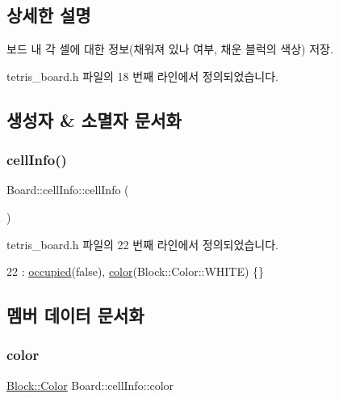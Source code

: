 \subsection{상세한 설명}
보드 내 각 셀에 대한 정보(채워져 있나 여부, 채운 블럭의 색상) 저장. 

tetris\+\_\+board.\+h 파일의 18 번째 라인에서 정의되었습니다.



\subsection{생성자 \& 소멸자 문서화}
\mbox{\label{struct_board_1_1cell_info_a6912555905168decac5c8dd1fba998a9}} 
\subsubsection{\texorpdfstring{cell\+Info()}{cellInfo()}}
{\footnotesize\ttfamily Board\+::cell\+Info\+::cell\+Info (\begin{DoxyParamCaption}{ }\end{DoxyParamCaption})\hspace{0.3cm}{\ttfamily [inline]}}



tetris\+\_\+board.\+h 파일의 22 번째 라인에서 정의되었습니다.


\begin{DoxyCode}
22 : \mbox{\hyperlink{struct_board_1_1cell_info_a518ee0af8b662d092a1e4dffefadf27c}{occupied}}(\textcolor{keyword}{false}), \mbox{\hyperlink{struct_board_1_1cell_info_ac4e0ca21aefe0f000144641e5eb6698d}{color}}(Block::Color::WHITE) \{\}
\end{DoxyCode}


\subsection{멤버 데이터 문서화}
\mbox{\label{struct_board_1_1cell_info_ac4e0ca21aefe0f000144641e5eb6698d}} 
\subsubsection{\texorpdfstring{color}{color}}
{\footnotesize\ttfamily \mbox{\hyperlink{class_block_ad054b4ac51df79aa910040b2a2fdf7b5}{Block\+::\+Color}} Board\+::cell\+Info\+::color}



